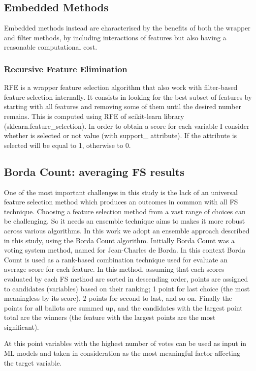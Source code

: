\subsection{Embedded Methods}
Embedded methods instead are characterised by the benefits of both the wrapper and filter methods, by including interactions of features but also having a reasonable computational cost.\par
\bigskip
\subsubsection{Recursive Feature Elimination}
RFE is a wrapper feature selection algorithm that also work with filter-based feature selection internally.\newline
It consists in looking for the best subset of features by starting with all features and removing some of them until the desired number remains.\newline
This is computed using RFE of scikit-learn library (sklearn.feature\_selection).
In order to obtain a score for each variable I consider whether is selected or not value (with support\_ attribute).
If the attribute is selected will be equal to 1, otherwise to 0.
\pagebreak
\subsection{Borda Count: averaging FS results}
One of the most important challenges in this study is the lack of an universal feature selection method which produces an outcomes in common with all FS technique. Choosing a feature selection method from a vast range of choices can be challenging. \newline
So it needs an ensemble technique aims to makes it more robust across various algorithms. In this work we adopt an ensemble approach described in this study\cite{sarkar2014robust}, using the Borda Count algorithm. Initially Borda Count was a voting system method, named for Jean-Charles de Borda\cite{borda1784memoire}.\newline
In this context Borda Count is used as a rank-based combination technique used for evaluate an average score for each feature. In this method, assuming that each scores evaluated by each FS method are sorted in descending order, points are assigned to candidates (variables) based on their ranking; 1 point for last choice (the most meaningless by its score), 2 points for second-to-last, and so on. Finally the points for all ballots are summed up, and the candidates with the largest point total are the winners (the feature with the largest points are the most significant).
\par
At this point variables with the highest number of votes can be used as input in ML models and taken in consideration as the most meaningful factor affecting the target variable.

